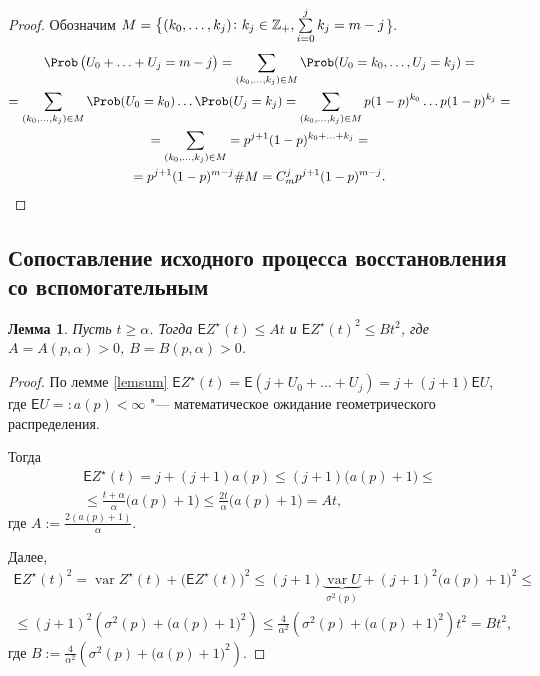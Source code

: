 \documentclass[a4paper]{article}
\newcommand{\Expect}{\mathsf{E}}
\newcommand{\nonneg}{\ensuremath\mathbb Z_+}
\DeclareMathOperator{\var}{\mathrm var}
\theoremstyle{plain}
\newtheorem{lem}[thm]{Лемма}
\theoremstyle{definition}
\theoremstyle{remark}
\begin{document}
\begin{proof}
   Обозначим $M = \big\{ (k_0, \ldots, k_j)\colon k_j \in \nonneg, \sum\limits_{i = 0}^j k_j = m - j$\big\}.
  \begin{multline*}
    \Prob\left( U_0 + \ldots + U_j = m - j\right) = \sum_{(k_0, \ldots, k_j) \in M} \Prob(U_0 = k_0, \ldots, U_j = k_j) =\\
    = \sum_{(k_0, \ldots, k_j) \in M} \Prob(U_0 = k_0)\ldots \Prob(U_j = k_j) = \sum_{(k_0, \ldots, k_j) \in M} p (1 - p)^{k_0}\ldots p (1 - p)^{k_j} =\\
    = \sum_{(k_0, \ldots, k_j) \in M} = p^{j + 1} (1 - p)^{k_0 + \ldots + k_j} =\\
    = p^{j + 1} (1 - p)^{m - j} \#M = C_m^j p^{j + 1} (1 - p)^{m - j}.
  \end{multline*}
\end{proof}

\subsection{Сопоставление исходного процесса восстановления со вспомогательным}

\begin{lem}\label{est}
  Пусть $t \geqslant \alpha$. Тогда $\Expect Z^\star(t) \leqslant At$ и $\Expect Z^\star(t)^2 \leqslant B t^2$, где $A = A(p, \alpha) > 0$, $B = B(p, \alpha) > 0$.
\end{lem}

\begin{proof}
  По лемме \ref{lemsum} $\Expect Z^\star(t) = \Expect(j + U_0 + \ldots + U_j) = j + (j + 1) \Expect U$, где $\Expect U =: a(p) < \infty$ "--- математическое ожидание геометрического распределения.

  Тогда
  \begin{multline*}
    \Expect Z^\star(t) = j + (j + 1) a(p) \leqslant (j + 1) \big(a(p) + 1\big) \leqslant\\
    \leqslant \frac{t + \alpha}{\alpha} \big(a(p) + 1\big) \leqslant \frac{2 t}{\alpha} \big( a(p) + 1 \big) = A t,
  \end{multline*}
  где $A := \frac{2 (a(p) + 1)}{\alpha}$.

  Далее,
  \begin{multline*}
    \Expect Z^\star(t)^2 = \var Z^\star(t) + \big(\Expect Z^\star(t) \big)^2 \leqslant (j + 1) \underbrace{\var U}_{\sigma^2(p)} + (j + 1)^2 \big( a(p) + 1 \big)^2 \leqslant\\
    \leqslant (j + 1)^2 \left( \sigma^2(p) + \big( a(p) + 1 \big)^2 \right) \leqslant \frac{4}{\alpha^2} \left( \sigma^2(p) + \big( a(p) + 1 \big)^2 \right) t^2 = B t^2,
  \end{multline*}
  где $B := \frac{4}{\alpha^2} \left( \sigma^2(p) + \big( a(p) + 1 \big)^2 \right)$.
\end{proof}
\end{document}
